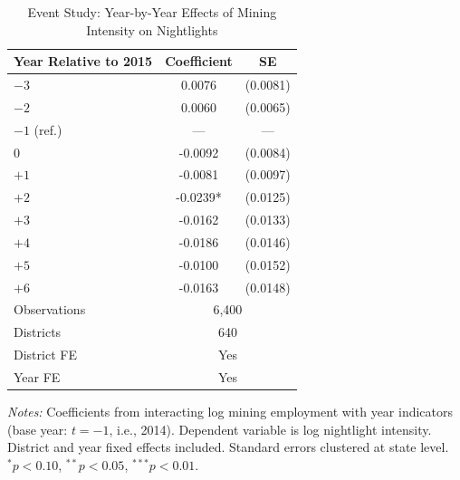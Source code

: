 \begin{table}[t]
\centering
\caption{Event Study: Year-by-Year Effects of Mining Intensity on Nightlights}
\label{tab:eventstudy}
\begin{threeparttable}
\begin{tabular}{lcc}
\toprule
Year Relative to 2015 & Coefficient & SE \\
\midrule
$-3$ & 0.0076 & (0.0081) \\
$-2$ & 0.0060 & (0.0065) \\
$-1$ (ref.) & --- & --- \\
$0$ & -0.0092 & (0.0084) \\
$+1$ & -0.0081 & (0.0097) \\
$+2$ & -0.0239* & (0.0125) \\
$+3$ & -0.0162 & (0.0133) \\
$+4$ & -0.0186 & (0.0146) \\
$+5$ & -0.0100 & (0.0152) \\
$+6$ & -0.0163 & (0.0148) \\
\midrule
Observations & \multicolumn{2}{c}{6,400} \\
Districts & \multicolumn{2}{c}{640} \\
District FE & \multicolumn{2}{c}{Yes} \\
Year FE & \multicolumn{2}{c}{Yes} \\
\bottomrule
\end{tabular}
\begin{tablenotes}
\item \textit{Notes:} Coefficients from interacting log mining employment with year indicators (base year: $t = -1$, i.e., 2014). Dependent variable is log nightlight intensity. District and year fixed effects included. Standard errors clustered at state level. $^{*}p<0.10$, $^{**}p<0.05$, $^{***}p<0.01$.
\end{tablenotes}
\end{threeparttable}
\end{table}
